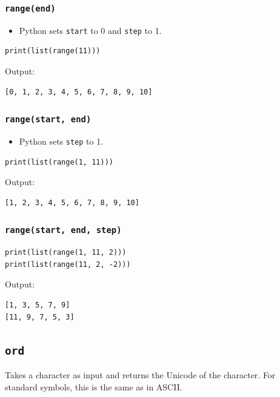 \documentclass[11pt]{article}
\begin{document}
\subsubsection{\texttt{range(end)}}
\label{sec:org164ae27}
\begin{itemize}
\item Python sets \texttt{start} to 0 and \texttt{step} to 1.
\end{itemize}

\begin{verbatim}
print(list(range(11)))
\end{verbatim}

 \noindent Output:

\begin{verbatim}
[0, 1, 2, 3, 4, 5, 6, 7, 8, 9, 10]
\end{verbatim}

\subsubsection{\texttt{range(start, end)}}
\label{sec:org7bee097}
\begin{itemize}
\item Python sets \texttt{step} to 1.
\end{itemize}

\begin{verbatim}
print(list(range(1, 11)))
\end{verbatim}

 \noindent Output:

\begin{verbatim}
[1, 2, 3, 4, 5, 6, 7, 8, 9, 10]
\end{verbatim}

\subsubsection{\texttt{range(start, end, step)}}
\label{sec:org58148d0}

\begin{verbatim}
print(list(range(1, 11, 2)))
print(list(range(11, 2, -2)))
\end{verbatim}

 \noindent Output:

\begin{verbatim}
[1, 3, 5, 7, 9]
[11, 9, 7, 5, 3]
\end{verbatim}

\subsection{\texttt{ord}}
\label{sec:org8c281e3}
Takes a character as input and returns the Unicode of the character. For standard symbols, this is the same as in ASCII.
\end{document}
